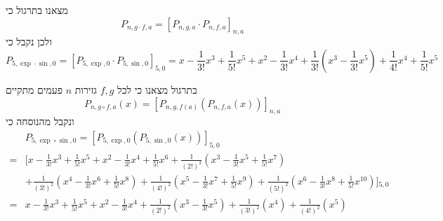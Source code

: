 מצאנו בתרגול כי
\[
	P_{n, g \cdot f, a} = {[P_{n, g, a} \cdot P_{n, f, a}]}_{n, a}
\]
ולכן נקבל כי
\[
	P_{5, \exp \cdot \sin, 0}
	= {[P_{5, \exp, 0} \cdot P_{5, \sin, 0}]}_{5, 0}
	= x - \frac{1}{3!} x^3 + \frac{1}{5!} x^5 + x^2 - \frac{1}{3!} x^4 + \frac{1}{3!} (x^3 - \frac{1}{3!} x^5) + \frac{1}{4!} x^4 + \frac{1}{5!} x^5
\]

בתרגול מצאנו כי לכל $f, g$ גזירות $n$ פעמים מתקיים
\[
	P_{n, g \circ f, a}(x) = {[P_{n, g, f(a)}(P_{n, f, a}(x))]}_{n, a}
\]
ונקבל מהנוסחה כי
\begin{align*}
	& P_{5, \exp \circ \sin, 0} = {[P_{5, \exp, 0}(P_{5, \sin, 0}(x))]}_{5, 0} \\
	= & [x - \frac{1}{3!} x^3 + \frac{1}{5!} x^5
	+ x^2 - \frac{1}{3!} x^4 + \frac{1}{5!} x^6
	+ \frac{1}{{(2!)}^2} (x^3 - \frac{1}{3!} x^5 + \frac{1}{5!} x^7) \\
	& + \frac{1}{{(3!)}^2} (x^4 - \frac{1}{3!} x^6 + \frac{1}{5!} x^8)
	+ \frac{1}{{(4!)}^2} (x^5 - \frac{1}{3!} x^7 + \frac{1}{5!} x^9)
	+ \frac{1}{{(5!)}^2} (x^6 - \frac{1}{3!} x^8 + \frac{1}{5!} x^{10})]{}_{5, 0} \\
	= & x - \frac{1}{3!} x^3 + \frac{1}{5!} x^5
	+ x^2 - \frac{1}{3!} x^4
	+ \frac{1}{{(2!)}^2} (x^3 - \frac{1}{3!} x^5)
	+ \frac{1}{{(3!)}^2} (x^4)
	+ \frac{1}{{(4!)}^2} (x^5)
\end{align*}


